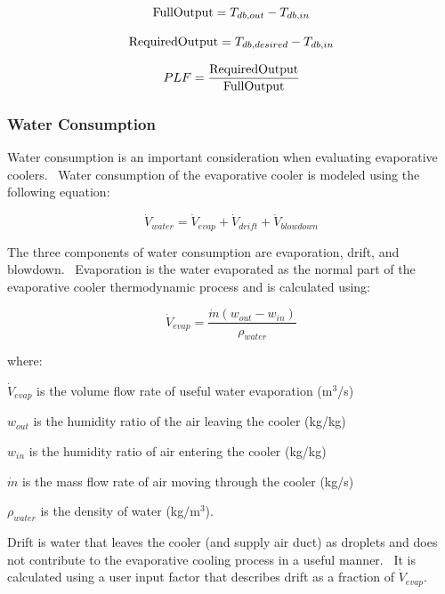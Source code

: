 \begin{equation}
{\rm{FullOutput}} = {T_{db,out}} - {T_{db,in}}
\label{eq:IECFullOutput}
\end{equation}

\begin{equation}
{\rm{RequiredOutput}} = {T_{db,desired}} - {T_{db,in}}
\label{eq:IECRequiredOutput}
\end{equation}

\begin{equation}
PLF = \frac{{{\rm{RequiredOutput}}}}{{{\rm{FullOutput}}}}
\label{eq:IECPLF}
\end{equation}


\subsubsection{Water Consumption}\label{water-consumption-1}

Water consumption is an important consideration when evaluating evaporative coolers.~ Water consumption of the evaporative cooler is modeled using the following equation:

\begin{equation}
{\dot V_{water}} = {\dot V_{evap}} + {\dot V_{drift}} + {\dot V_{blowdown}}
\end{equation}

The three components of water consumption are evaporation, drift, and blowdown.~ Evaporation is the water evaporated as the normal part of the evaporative cooler thermodynamic process and is calculated using:

\begin{equation}
{\dot V_{evap}} = \frac{{\dot m\left( {{w_{out}} - {w_{in}}} \right)}}{{{\rho_{water}}}}
\end{equation}

where:

\({\dot V_{evap}}\) is the volume flow rate of useful water evaporation (m\(^{3}\)/s)

\({w_{out}}\) is the humidity ratio of the air leaving the cooler (kg/kg)

\({w_{in}}\) is the humidity ratio of air entering the cooler (kg/kg)

\(\dot m\) is the mass flow rate of air moving through the cooler (kg/s)

\({\rho_{water}}\) is the density of water (kg/m\(^{3}\)).

Drift is water that leaves the cooler (and supply air duct) as droplets and does not contribute to the evaporative cooling process in a useful manner.~ It is calculated using a user input factor that describes drift as a fraction of \({\dot V_{evap}}\).

